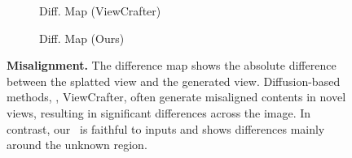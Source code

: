 \begin{figure}[t]
\begin{subfigure}{\imgWidth}
     \caption*{Diff. Map (ViewCrafter)}
    \end{subfigure}
    \begin{subfigure}{\imgWidth}
      \caption*{Diff. Map (Ours)}
      \end{subfigure}
    \caption{\textbf{Misalignment.} The difference map shows the absolute difference between the splatted view and the generated view. Diffusion-based methods, \eg, ViewCrafter, often generate misaligned contents in novel views, resulting in significant differences across the image. In contrast, our \method\ is faithful to inputs and shows differences mainly around the unknown region.}
    \label{fig:main-diff}
\end{figure}


